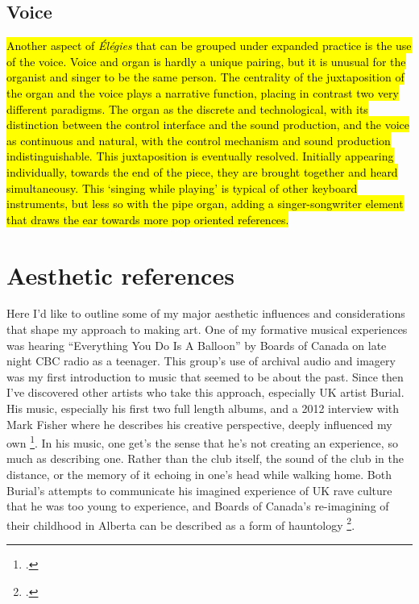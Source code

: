 \documentclass[12pt,twoside,maitrise]{dms_ks}
\theoremstyle{definition}
\begin{document}
{\subsection{Voice}

\hl{Another aspect of \textit{Élégies} that can be grouped under expanded practice is the use of the voice. 
Voice and organ is hardly a unique pairing, but it is unusual for the organist and singer to be the same person.
The centrality of the juxtaposition of the organ and the voice plays a narrative function, placing in contrast two very different paradigms.
The organ as the discrete and technological, with its distinction between the control interface and the sound production, and the voice as continuous and natural, with the control mechanism and sound production indistinguishable. 
This juxtaposition is eventually resolved.
Initially appearing individually, towards the end of the piece, they are brought together and heard simultaneousy.
This `singing while playing' is typical of other keyboard instruments, but less so with the pipe organ, adding a singer-songwriter element that draws the ear towards more pop oriented references.}


\section{Aesthetic references}

Here I'd like to outline some of my major aesthetic influences and considerations that shape my approach to making art. 
One of my formative musical experiences was hearing “Everything You Do Is A Balloon” by Boards of Canada on late night CBC radio as a teenager. 
This group's use of archival audio and imagery was my first introduction to music that seemed to be about the past. 
Since then I've discovered other artists who take this approach, especially UK artist Burial. 
His music, especially his first two full length albums, and a 2012 interview with Mark Fisher where he describes his creative perspective, deeply influenced my own \footcite{fisher_burial_2012}. 
In his music, one get's the sense that he's not creating an experience, so much as describing one. 
Rather than the club itself, the sound of the club in the distance, or the memory of it echoing in one's head while walking home. 
Both Burial's attempts to communicate his imagined experience of UK rave culture that he was too young to experience, and Boards of Canada's re-imagining of their childhood in Alberta can be described as a form of hauntology \footcite{alary_vers_2020}.

}
\end{document}
